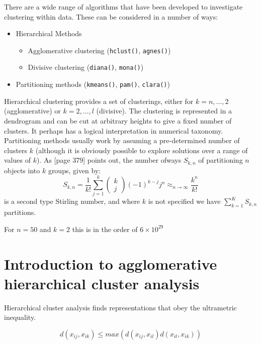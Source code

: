 There are a wide range of algorithms that have been developed to investigate clustering within data.   These can be considered in a number of ways:

\begin{itemize}
\item Hierarchical Methods
  \begin{itemize}
  \item Agglomerative clustering (\verb+hclust()+, \verb+agnes()+)
  \item Divisive clustering (\verb+diana()+, \verb+mona()+)
  \end{itemize}
\item Partitioning methods (\verb+kmeans()+, \verb+pam()+, \verb+clara()+)
\end{itemize}


Hierarchical clustering provides a set of clusterings, either for $k = n, \ldots, 2$ (agglomerative) or $k = 2, \ldots, l$ (divisive).   The clustering is represented in a dendrogram and can be cut at arbitrary heights to give a fixed number of clusters.   It perhaps has a logical interpretation in numerical taxonomy.  Partitioning methods usually work by assuming a pre-determined number of clusters $k$ (although it is obviously possible to explore solutions over a range of values of $k$).   As [page 379] \cite{Seber:1984} points out, the number ofways $S_{k,n}$ of partitioning $n$ objects into $k$ groups, given by:
\begin{displaymath}
S_{k,n} = \frac{1}{k!} \sum_{j=1}^{k} \left( \begin{array}{c}k \\ j \end{array} \right) (-1)^{k-j} j^{n} \approx_{n \to \infty} \frac{k^{n}}{k!}
\end{displaymath} 
is a second type Stirling number, and where $k$ is not specified we have $\sum_{k=1}^{K} S_{k,n}$ partitions.   

For $n= 50$ and $k=2$ this is in the order of $6 \times 10^{29}$

\section{Introduction to agglomerative hierarchical cluster analysis}

Hierarchical cluster analysis finds representations that obey the ultrametric inequality.

\begin{displaymath}
d(x_{ij}, x_{ik}) \leq max(d(x_{ij}, x_{il}) d(x_{il}, x_{ik}) )
\end{displaymath}

